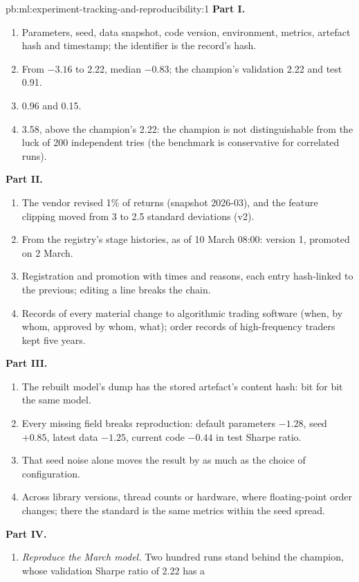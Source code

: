 \begin{solution}{pb:ml:experiment-tracking-and-reproducibility:1}
\textbf{Part I.}
\begin{enumerate}
\item Parameters, seed, data snapshot, code version, environment, metrics, artefact hash and timestamp; the identifier is the
record's hash.
\item From $-3.16$ to 2.22, median $-0.83$; the champion's validation 2.22 and test 0.91.
\item 0.96 and 0.15.
\item 3.58, above the champion's 2.22: the champion is not distinguishable from the luck of 200 independent tries (the benchmark
is conservative for correlated runs).
\end{enumerate}
\textbf{Part II.}
\begin{enumerate}[resume]
\item The vendor revised 1\% of returns (snapshot 2026-03), and the feature clipping moved from 3 to 2.5 standard deviations (v2).
\item From the registry's stage histories, as of 10 March 08:00: version 1, promoted on 2 March.
\item Registration and promotion with times and reasons, each entry hash-linked to the previous; editing a line breaks the chain.
\item Records of every material change to algorithmic trading software (when, by whom, approved by whom, what); order records of
high-frequency traders kept five years.
\end{enumerate}
\textbf{Part III.}
\begin{enumerate}[resume]
\item The rebuilt model's dump has the stored artefact's content hash: bit for bit the same model.
\item Every missing field breaks reproduction: default parameters $-1.28$, seed $+0.85$, latest data $-1.25$, current code
$-0.44$ in test Sharpe ratio.
\item That seed noise alone moves the result by as much as the choice of configuration.
\item Across library versions, thread counts or hardware, where floating-point order changes; there the standard is the same
metrics within the seed spread.
\end{enumerate}
\textbf{Part IV.}
\begin{enumerate}[resume]
\item \emph{Reproduce the March model.} Two hundred runs stand behind the champion, whose validation Sharpe ratio of 2.22 has a

\end{enumerate}
\end{solution}
